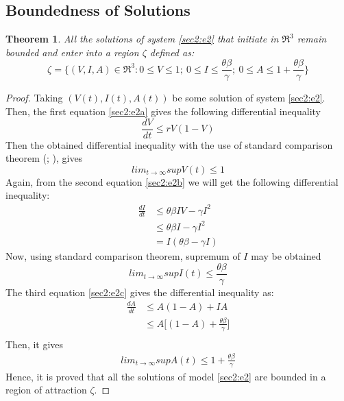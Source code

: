\documentclass[12pt,a4wide]{report}
\newtheorem{theorem}{Theorem}[section]
\numberwithin{equation}{chapter}
\numberwithin{theorem}{chapter}
\begin{document}
\subsection{Boundedness of Solutions}
\begin{theorem} \label{Theorem 3.2}
All the solutions of system \eqref{sec2:e2} that initiate in $\Re^3$ remain bounded and enter into a region $\zeta$ defined as:\\
\begin{equation*}
\zeta=\bigg\{(V,I,A)\in \Re^3:0 \leq V\leq 1; ~0 \leq I\leq \frac{\theta \beta}{\gamma};~0\leq A\leq 1+\frac{\theta \beta}{\gamma}\bigg\}
\end{equation*}
\end{theorem}
\begin{proof}
Taking $(V(t),I(t), A(t))$ be some solution of system \eqref{sec2:e2}. Then, the first equation \eqref{sec2:e2a} gives the following differential inequality
\begin{equation}\label{sec3:e3}
\frac{dV}{dt}\leq rV(1-V)
\end{equation}
Then the obtained differential inequality with the use of standard comparison theorem (\cite{hale1969}; \cite{freedman1985}), gives
\begin{equation}\label{sec3:e4}
lim_{t\rightarrow\infty} sup V(t) \leq 1
\end{equation}
Again, from the second equation \eqref{sec2:e2b} we will get the following differential inequality:
\begin{align*}\label{sec3:e5}
\frac{dI}{dt}&\leq \theta \beta IV - \gamma I^2\\
                &\leq \theta \beta I - \gamma I^2\\
                &=I(\theta \beta - \gamma I)
\end{align*}
Now, using standard comparison theorem, supremum of $I$ may be obtained
\begin{equation}\label{sec3:e6}
lim_{t\rightarrow\infty} sup I(t) \leq \frac{\theta \beta}{\gamma}
\end{equation}
The third equation \eqref{sec2:e2c} gives the differential inequality as:
\begin{align*}
\frac{dA}{dt}&\leq A(1-A) + IA\\
             &\leq A\bigg[(1-A)+\frac{\theta \beta}{\gamma}\bigg]\\
\end{align*}
Then, it gives
\begin{align}\label{sec3:e7}
lim_{t\rightarrow\infty} sup A(t) \leq 1 + \frac{\theta \beta}{\gamma}
\end{align}
Hence, it is proved that all the solutions of model \eqref{sec2:e2} are bounded in a region of attraction $\zeta$.
\end{proof}
\vspace{-.5cm}
\end{document}
